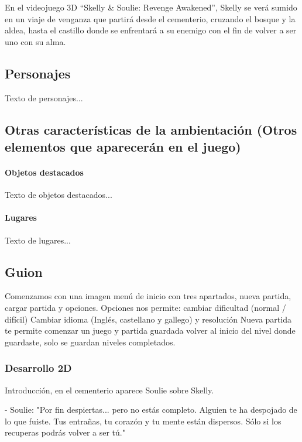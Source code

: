 \documentclass[12pt,a4paper,twoside,spanish]{article}      %
\begin{document}
En el videojuego 3D “Skelly \& Soulie: Revenge Awakened”, Skelly se verá sumido en un viaje de venganza que partirá desde el cementerio, cruzando el bosque y la aldea, hasta el castillo donde se enfrentará a su enemigo con el fin de volver a ser uno con su alma.

\subsection{Personajes}
Texto de personajes...

\subsection{Otras características de la ambientación (Otros elementos que aparecerán en el juego)}
\paragraph{Objetos destacados}
Texto de objetos destacados...

\paragraph{Lugares}
Texto de lugares...



\subsection{Guion}
Comenzamos con una imagen menú de inicio con tres apartados, nueva partida, cargar partida y opciones.
Opciones nos permite: cambiar dificultad (normal / difícil) Cambiar idioma (Inglés, castellano y gallego) y resolución 
Nueva partida te permite comenzar un juego y partida guardada volver al inicio del nivel donde guardaste, solo se guardan niveles completados.

\subsubsection{Desarrollo 2D}
Introducción, en el cementerio aparece Soulie sobre Skelly.

- Soulie: "Por fin despiertas... pero no estás completo. Alguien te ha despojado de lo que fuiste. Tus entrañas, tu corazón y tu mente están dispersos. Sólo si los recuperas podrás volver a ser tú."
\end{document}
